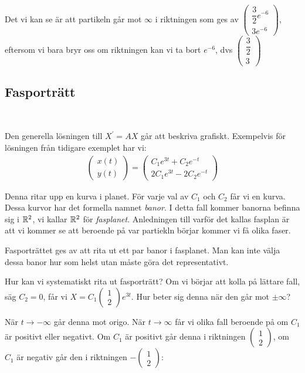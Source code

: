 \par\bigskip
\noindent Det vi kan se är att partikeln går mot $\infty$ i riktningen som ges av $\begin{pmatrix}\dfrac{3}{2}e^{-6}\\3e^{-6}\end{pmatrix}$, eftersom vi bara bryr oss om riktningen kan vi ta bort $e^{-6}$, dvs $\begin{pmatrix}\dfrac{3}{2}\\3\end{pmatrix}$
\par\bigskip
\subsection{Fasporträtt}\hfill\\
\par\bigskip
\noindent Den generella lösningen till $X^{\prime} = AX$ går att beskriva grafiskt. Exempelvis för lösningen från tidigare exemplet har vi:
\begin{equation*}
  \begin{gathered}
    \begin{pmatrix}x(t)\\y(t)\end{pmatrix} = \begin{pmatrix}C_1e^{3t}+C_2e^{-t}\\2C_1e^{3t}-2C_2e^{-t}\end{pmatrix}
  \end{gathered}
\end{equation*}
\par\bigskip
\noindent Denna ritar upp en kurva i planet. För varje val av $C_1$ och $C_2$ får vi en kurva. Dessa kurvor har det formella namnet \textit{banor}. I detta fall kommer banorna befinna sig i $\mathbb{R}^2$, vi kallar $\mathbb{R}^2$ för \textit{fasplanet}. Anledningen till varför det kallas fasplan är att vi kommer se att beroende på var partiekln börjar kommer vi få olika faser.
\par\bigskip
\noindent Fasporträttet ges av att rita ut ett par banor i fasplanet. Man kan inte välja dessa banor hur som helst utan måste göra det representativt.\par
\noindent Hur kan vi systematiskt rita ut fasporträtt? Om vi börjar att kolla på lättare fall, säg $C_2=0$, får vi $X = C_1\begin{pmatrix}1\\2\end{pmatrix}e^{3t}$. Hur beter sig denna när den går mot $\pm\infty$?\par
\noindent När $t\to-\infty$ går denna mot origo. När $t\to\infty$ får vi olika fall beroende på om $C_1$ är positivt eller negativt. Om $C_1$ är positivt går denna i riktningen $\begin{pmatrix}1\\2\end{pmatrix}$, om $C_1$ är negativ går den i riktningen $-\begin{pmatrix}1\\2\end{pmatrix}$:

